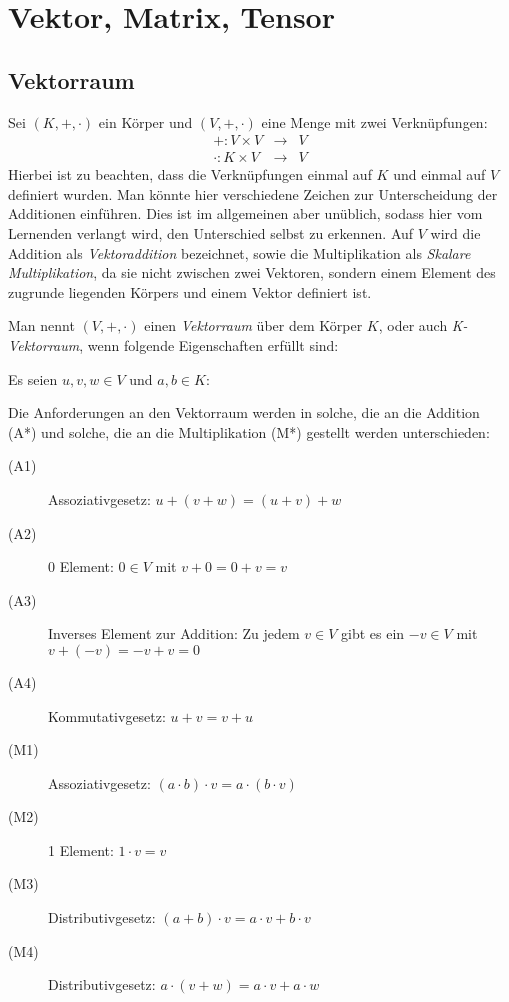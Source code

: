 
\chapter{Vektor, Matrix, Tensor}



\section{Vektorraum}\label{vectorspace}

Sei $(K,+,\cdot )$ ein Körper und $(V,+ ,\cdot)$ eine Menge mit zwei Verknüpfungen:
\begin{eqnarray*}
+ : V\times V &\longrightarrow& V \\
\cdot : K \times V &\longrightarrow& V 
\end{eqnarray*}
Hierbei ist zu beachten, dass die Verknüpfungen einmal auf $K$ und einmal auf $V$ definiert wurden. Man könnte hier verschiedene Zeichen zur Unterscheidung der Additionen einführen. Dies ist im allgemeinen aber unüblich, sodass hier vom Lernenden verlangt wird, den Unterschied selbst zu erkennen. Auf $V$ wird die Addition als \textsl{Vektoraddition} bezeichnet, sowie die Multiplikation als \textsl{Skalare Multiplikation}, da sie nicht zwischen zwei Vektoren, sondern einem Element des zugrunde liegenden Körpers und einem Vektor definiert ist. 

Man nennt $(V,+ ,\cdot)$ einen \textsl{Vektorraum} über dem Körper $K$, oder auch \textsl{K-Vektorraum}, wenn folgende Eigenschaften erfüllt sind:

\noindent Es seien $u,v,w \in V$ und $a,b \in K$:

Die Anforderungen an den Vektorraum werden in solche, die an die Addition (A*) und solche, die an die Multiplikation (M*) gestellt werden unterschieden:

\begin{description}
\item[(A1)] Assoziativgesetz: $u+(v+w) = (u+v)+w$
\item[(A2)] $0$ Element: $0\in V$ mit $v+0=0+v=v$
\item[(A3)] Inverses Element zur Addition: Zu jedem $v\in V$ gibt es ein $-v\in V$ mit $v+(-v) = -v+v = 0$
\item[(A4)] Kommutativgesetz: $u+v = v+u$
\end{description}

\begin{description}
\item[(M1)] Assoziativgesetz: $(a \cdot b)\cdot v = a\cdot (b\cdot v)$
\item[(M2)] 1 Element: $1\cdot v = v$
\item[(M3)] Distributivgesetz: $(a+b)\cdot v = a\cdot v + b\cdot v$
\item[(M4)] Distributivgesetz: $a\cdot(v+w) = a\cdot v + a\cdot w$
\end{description}

